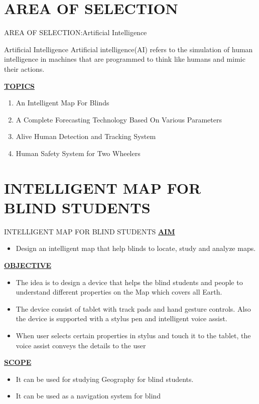 \documentclass[svgnames,9pt]{beamer}
\begin{document}
\section{AREA OF SELECTION}
\begin{frame}{AREA OF SELECTION:Artificial Intelligence}
	\begin{block}{Artificial Intelligence}
		Artificial intelligence(AI) refers to the
		simulation of human intelligence in
		machines that are programmed to
		think like humans and mimic their
		actions.

	\end{block}
	\underline{\textbf{TOPICS}}
	\begin{enumerate}
		\item An Intelligent Map For Blinds
		\item A Complete Forecasting Technology Based On Various Parameters
		\item Alive Human Detection and Tracking System
		\item Human Safety System for Two Wheelers
	\end{enumerate}
\end{frame}
\section{INTELLIGENT MAP FOR BLIND STUDENTS}
\begin{frame}{INTELLIGENT MAP FOR BLIND STUDENTS}
	\underline{\textbf{AIM}}
	\begin{itemize}
		\item Design an intelligent map that help blinds to locate, study and analyze maps.
	\end{itemize}
	\underline{\textbf{OBJECTIVE}}
		\begin{itemize}
		\item The idea is to design a device that helps the blind students and people to
		understand different properties on the Map which covers all Earth.
			\item The device consist of tablet with track pads and hand gesture controls. Also
		the device is supported with a stylus pen and intelligent voice assist.
			\item When user selects certain properties in stylus and touch it to the tablet, the
		voice assist conveys the details to the user
	\end{itemize}
	\underline{\textbf{SCOPE}}
	\begin{itemize}
		\item It can be used for studying Geography for blind students.
		\item It can be used as a navigation system for blind
	\end{itemize}
\end{frame}
\end{document}
